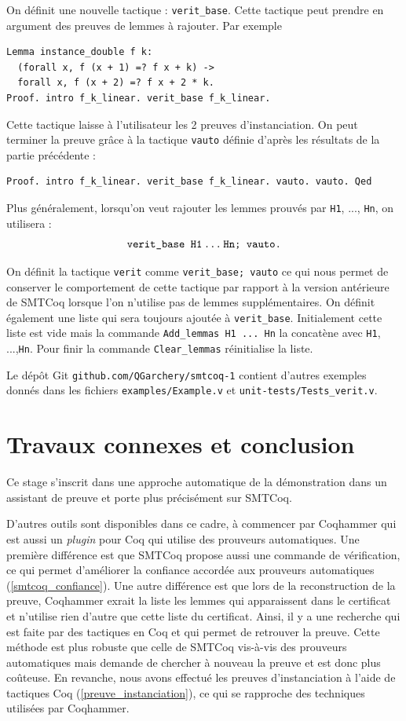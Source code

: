 \documentclass[11pt]{article}
\begin{document}
On définit une nouvelle tactique : \texttt{verit\_base}. Cette tactique peut prendre en argument des preuves de lemmes à rajouter. Par exemple 
\begin{lstlisting}[frame=single]
Lemma instance_double f k:
  (forall x, f (x + 1) =? f x + k) ->
  forall x, f (x + 2) =? f x + 2 * k.
Proof. intro f_k_linear. verit_base f_k_linear.
\end{lstlisting}
Cette tactique laisse à l'utilisateur les 2 preuves d'instanciation. On peut terminer la preuve grâce à la tactique \texttt{vauto} définie d'après les résultats de la partie précédente : 
\begin{lstlisting}[frame=single]
Proof. intro f_k_linear. verit_base f_k_linear. vauto. vauto. Qed
\end{lstlisting}
Plus généralement, lorsqu'on veut rajouter les lemmes prouvés par \texttt{H1}, ..., \texttt{Hn}, on utilisera : 
\[\texttt{verit\_base H1\,...\,Hn; vauto.}\]

On définit la tactique \texttt{verit} comme \texttt{verit\_base; vauto} ce qui nous permet de conserver le comportement de cette tactique par rapport à la version antérieure de SMTCoq lorsque l'on n'utilise pas de lemmes supplémentaires. On définit également une liste qui sera toujours ajoutée à \texttt{verit\_base}. Initialement cette liste est vide mais la commande \texttt{Add\_lemmas H1\,...\,Hn} la concatène avec \texttt{H1}, ...,\texttt{Hn}. Pour finir la commande \texttt{Clear\_lemmas} réinitialise la liste. 

Le dépôt Git \texttt{github.com/QGarchery/smtcoq-1} contient d'autres exemples donnés dans les fichiers \texttt{examples/Example.v} et \texttt{unit-tests/Tests\_verit.v}.


\section{Travaux connexes et conclusion}

Ce stage s'inscrit dans une approche automatique de la démonstration dans un assistant de preuve et porte plus précisément sur SMTCoq. 

D'autres outils sont disponibles dans ce cadre, à commencer par Coqhammer \cite{coqhammer} qui est aussi un \textit{plugin} pour Coq qui utilise des prouveurs automatiques. Une première différence est que SMTCoq propose aussi une commande de vérification, ce qui permet d'améliorer la confiance accordée aux prouveurs automatiques (\ref{smtcoq_confiance}). Une autre différence est que lors de la reconstruction de la preuve, Coqhammer exrait la liste les lemmes qui apparaissent dans le certificat et n'utilise rien d'autre que cette liste du certificat. Ainsi, il y a une recherche qui est faite par des tactiques en Coq et qui permet de retrouver la preuve. Cette méthode est plus robuste que celle  de SMTCoq vis-à-vis des prouveurs automatiques mais demande de chercher à nouveau la preuve et est donc plus coûteuse. En revanche, nous avons effectué les preuves d'instanciation  à l'aide de tactiques Coq (\ref{preuve_instanciation}), ce qui se rapproche des techniques utilisées par Coqhammer. 
\end{document}
